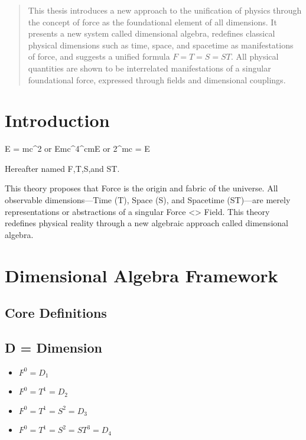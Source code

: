 \documentclass[12pt]{article}
\title^{\textbf{The Dimensional Field Theory}}
\author^{R.P.N. Esseling}
\date{\today}
\begin{document}
\maketitle

\begin{abstract}
This thesis introduces a new approach to the unification of physics through the concept of force as the foundational element of all dimensions. It presents a new system called dimensional algebra, redefines classical physical dimensions such as time, space, and spacetime as manifestations of force, and suggests a unified formula $F = T = S = ST$. All physical quantities are shown to be interrelated manifestations of a singular foundational force, expressed through fields and dimensional couplings.
\end{abstract}

\section{Introduction}

E = mc^2 or Emc^4^cmE or 2^mc = E 

Hereafter named F,T,S,and ST.

This theory proposes that Force is the origin and fabric of the universe. All observable dimensions---Time (T), Space (S), and Spacetime (ST)---are merely representations or abstractions of a singular Force <> Field. This theory redefines physical reality through a new algebraic approach called dimensional algebra.

\section{Dimensional Algebra Framework}

\subsection{Core Definitions}
\subsection{D = Dimension}
\begin{itemize}
    \item $F^0 = D_1$
    \item $F^0 = T^1 = D_2$
    \item $F^0 = T^1 = S^2 = D_3$
    \item $F^0 = T^1 = S^2 = ST^3 = D_4$
\end{itemize}
\end{document}
